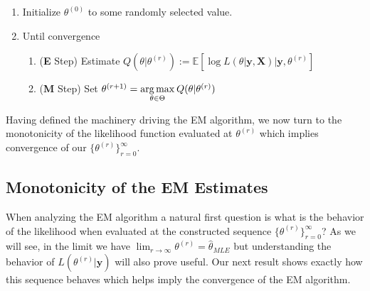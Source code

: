 \documentclass{article}
\newcommand{\E}{{\mathbb{E}}}
\begin{document}
\begin{enumerate}
\item Initialize $\theta^{(0)}$ to some randomly selected value. 
\item Until convergence
	\begin{enumerate}
	\item (\textbf{E} Step) Estimate $Q(\theta|\theta^{(r)}):= \E\left[\log L(\theta|\mathbf{y},\mathbf{X})\big|\mathbf{y},\theta^{(r)}\right]$
	\item (\textbf{M} Step) Set $\theta^{(r+1)} = \underset{\theta\in\Theta}{\arg\max} \hspace{.2em}Q(\theta|\theta^{(r)})$
	\end{enumerate}
\end{enumerate}
Having defined the machinery driving the EM algorithm, we now turn to the monotonicity of the likelihood function evaluated at $\theta^{(r)}$ which implies convergence of our $\{\theta^{(r)}\}_{r=0}^{\infty}$. 

\subsection{Monotonicity of the EM Estimates}

When analyzing the EM algorithm a natural first question is what is the behavior of the likelihood when evaluated at the constructed sequence $\{\theta^{(r)}\}_{r=0}^{\infty}$? As we will see, in the limit we have $\lim_{r\to\infty}\theta^{(r)} = \hat{\theta}_{MLE}$ but understanding the behavior of $L(\theta^{(r)}|\mathbf{y})$ will also prove useful. Our next result shows exactly how this sequence behaves which helps imply the convergence of the EM algorithm.
\end{document}
